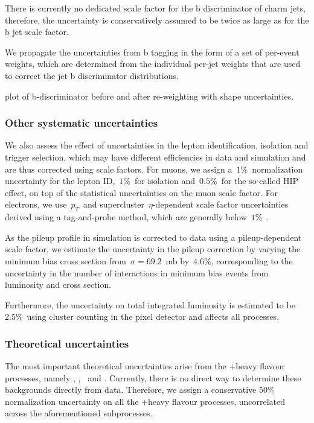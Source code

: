 There is currently no dedicated scale factor for the b discriminator of charm jets, therefore, the uncertainty is conservatively assumed to be twice as large as for the b jet scale factor.

We propagate the uncertainties from b tagging in the form of a set of per-event weights, which are determined from the individual per-jet weights that are used to correct the jet b discriminator distributions.

\fixme plot of b-discriminator before and after re-weighting with shape uncertainties.

\subsubsection{Other systematic uncertainties}
We also assess the effect of uncertainties in the lepton identification, isolation and trigger selection, which may have different efficiencies in data and simulation and are thus corrected using scale factors. For muons, we assign a~$1\%$~normalization uncertainty for the lepton ID,~$1\%$~for isolation and~$0.5\%$~for the so-called HIP effect, on top of the statistical uncertainties on the muon scale factor\cite{CMS:2017_mu_sf}. For electrons, we use~$p_T$~and supercluster~$\eta$-dependent scale factor uncertainties derived using a tag-and-probe method, which are generally below~$1\%$~\cite{CMS:2017_ele_sf}.

As the pileup profile in simulation is corrected to data using a pileup-dependent scale factor, we estimate the uncertainty in the pileup correction by varying the minimum bias cross section from~$\sigma = 69.2$~mb by~$4.6\%$, corresponding to the uncertainty in the number of interactions in minimum bias events from luminosity and cross section\cite{CMS:2017_pu_weight_twiki}.

Furthermore, the uncertainty on total integrated luminosity is estimated to be~$2.5\%$~using cluster counting in the pixel detector and affects all processes\cite{CMS:2017sdi,CMS:2017_lumi}.

\subsubsection{Theoretical uncertainties}
The most important theoretical uncertainties arise from the \ttbar+heavy flavour processes, namely \ttbb, \tttwob, \ttb~and \ttcc. Currently, there is no direct way to determine these backgrounds directly from data. Therefore, we assign a conservative 50\% normalization uncertainty on all the \ttbar+heavy flavour processes, uncorrelated across the aforementioned subprocesses.

